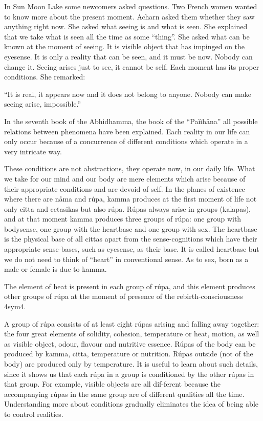 \documentclass[10pt,a4paper,final]{article}
\begin{document}
In Sun Moon Lake some newcomers asked
questions. Two French women wanted to know more about the present
moment. Acharn asked them whether they saw anything right now. She asked
what seeing is and what is seen. She explained that we take what is seen
all the time as some ``thing''. She asked what can be known at the
moment of seeing. It is visible object that has impinged on the
eyesense. It is only a reality that can be seen, and it must be now.
Nobody can change it. Seeing arises just to see, it cannot be self. Each
moment has its proper conditions. She remarked:

``It is real, it appears now and it does not
belong to anyone. Nobody can make seeing arise, impossible.''

In the seventh book of the Abhidhamma, the
book of the ``Paììhåna''
all possible relations between
phenomena have been
explained. Each reality in our life can
only occur because of a concurrence of different conditions which
operate in a very intricate way. 

These conditions are not
abstractions, they operate now, in our daily life. What we take for our
mind and our body are mere elements which arise because of their
appropriate conditions and are devoid of self. In the planes
of existence where there are nåma and rúpa, kamma produces at the first
moment of life not only citta and cetasikas but also rúpa. Rúpas always
arise in groups (kalapas), and at that moment kamma produces three
groups of rúpa: one group with bodysense, one group with the heartbase
and one group with sex. The heartbase is the physical base of all cittas
apart from the sense-cognitions which have their appropriate
sense-bases, such as eyesense, as their base. It is called heartbase but
we do not need to think of ``heart'' in conventional sense. As to sex,
born as a male or female is due to kamma. 

The element of heat is present in each group
of rúpa, and this element produces other groups of rúpa at the moment of
presence of the rebirth-consciousness
\protect\hyperlinksdfootnote4sym4. 

A group of rúpa consists of at least eight
rúpas arising and falling away together: the four great elements of
solidity, cohesion, temperature or heat, motion, as well as visible
object, odour, flavour and nutritive essence. Rúpas of the body can be
produced by kamma, citta, temperature or nutrition. Rúpas outside (not
of the body) are produced only by temperature. It is useful to learn
about such details, since it shows us that each rúpa in a group is
conditioned by the other rúpas in that group. For example, visible
objects are all dif-ferent because the accompanying rúpas in the same
group are of different qualities all the time. Understanding more about
conditions gradually eliminates the idea of being able to control
realities. 
\end{document}
